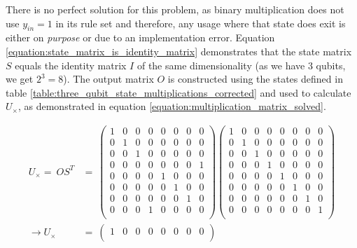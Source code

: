 \newpage

There is no perfect solution for this problem, as binary multiplication does not use $y_{in} = 1$ in its rule set and therefore, any usage where that state does exit is either on \emph{purpose} or due to an implementation error. Equation \ref{equation:state_matrix_is_identity_matrix} demonstrates that the state matrix $S$ equals the identity matrix $I$ of the same dimensionality (as we have 3 qubits, we get $2^3 = 8$). The output matrix $O$ is constructed using the states defined in table \ref{table:three_qubit_state_multiplications_corrected} and used to calculate $U_{\times}$, as demonstrated in equation \ref{equation:multiplication_matrix_solved}.

\begin{equation}
    \begin{split}
        U_{\times} =\ OS^T &=\ \begin{pmatrix}
         1 & 0 & 0 & 0 & 0 & 0 & 0 & 0\\
         0 & 1 & 0 & 0 & 0 & 0 & 0 & 0\\
         0 & 0 & 1 & 0 & 0 & 0 & 0 & 0\\
         0 & 0 & 0 & 0 & 0 & 0 & 0 & 1\\
         0 & 0 & 0 & 0 & 1 & 0 & 0 & 0\\
         0 & 0 & 0 & 0 & 0 & 1 & 0 & 0\\
         0 & 0 & 0 & 0 & 0 & 0 & 1 & 0\\
         0 & 0 & 0 & 1 & 0 & 0 & 0 & 0\\
         \end{pmatrix}\begin{pmatrix}
         1 & 0 & 0 & 0 & 0 & 0 & 0 & 0\\
         0 & 1 & 0 & 0 & 0 & 0 & 0 & 0\\ 
         0 & 0 & 1 & 0 & 0 & 0 & 0 & 0\\
         0 & 0 & 0 & 1 & 0 & 0 & 0 & 0\\
         0 & 0 & 0 & 0 & 1 & 0 & 0 & 0\\
         0 & 0 & 0 & 0 & 0 & 1 & 0 & 0\\
         0 & 0 & 0 & 0 & 0 & 0 & 1 & 0\\
         0 & 0 & 0 & 0 & 0 & 0 & 0 & 1\\
        \end{pmatrix} \\ 
        \rightarrow U_{\times} &=\ \begin{pmatrix}
         1 & 0 & 0 & 0 & 0 & 0 & 0 & 0\\

\end{pmatrix}
\end{split}
\end{equation}
